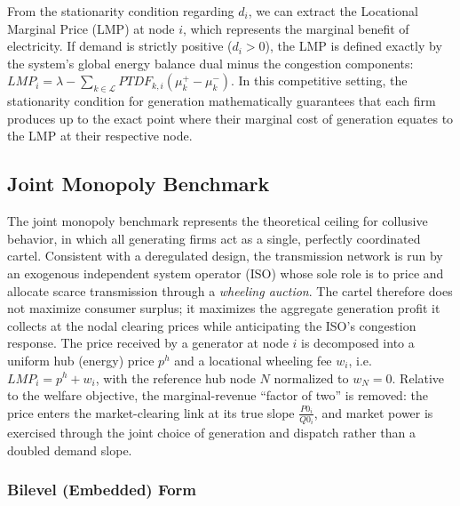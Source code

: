 \documentclass[lettersize,journal]{IEEEtran}
\begin{document}
From the stationarity condition regarding $d_i$, we can extract the Locational Marginal Price (LMP) at node $i$, which represents the marginal benefit of electricity. If demand is strictly positive ($d_i > 0$), the LMP is defined exactly by the system's global energy balance dual minus the congestion components: $LMP_i = \lambda - \sum_{k \in \mathcal{L}} PTDF_{k,i} (\mu_k^+ - \mu_k^-)$. In this competitive setting, the stationarity condition for generation mathematically guarantees that each firm produces up to the exact point where their marginal cost of generation equates to the LMP at their respective node.

\subsection{Joint Monopoly Benchmark}

The joint monopoly benchmark represents the theoretical ceiling for
collusive behavior, in which all generating firms act as a single,
perfectly coordinated cartel. Consistent with a deregulated design, the
transmission network is run by an exogenous independent system operator
(ISO) whose sole role is to price and allocate scarce transmission through
a \emph{wheeling auction}. The cartel therefore does not maximize consumer
surplus; it maximizes the aggregate generation profit it collects at the
nodal clearing prices while anticipating the ISO's congestion response.
The price received by a generator at node $i$ is
decomposed into a uniform hub (energy) price $p^h$ and a locational
wheeling fee $w_i$, i.e.\ $LMP_i = p^h + w_i$, with the reference hub node
$N$ normalized to $w_N = 0$. Relative to the welfare objective, the
marginal-revenue ``factor of two'' is removed: the price enters the
market-clearing link at its true slope $\tfrac{P0_i}{Q0_i}$, and market
power is exercised through the joint choice of generation and dispatch
rather than a doubled demand slope.

\subsubsection{Bilevel (Embedded) Form}
\end{document}
